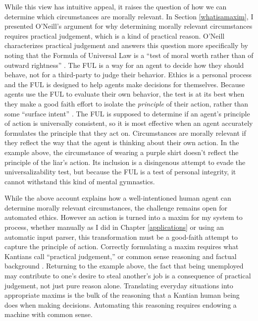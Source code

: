 \begin{isabellebody}
\begin{isamarkuptext}
While this view has intuitive appeal, it raises the question of how we can determine
which circumstances are morally relevant. In Section \ref{whatisamaxim}, I presented O'Neill's argument for why
determining morally relevant circumstances requires practical judgement, which is a kind of practical
reason. O'Neill characterizes practical judgement and answers this question more specifically
by noting that the Formula of Universal Law is
a ``test of moral worth rather than of outward rightness'' \citep[98]{constofreason}. The FUL is a way 
for an agent to decide how they should behave, not for a third-party to judge their behavior. Ethics is 
a personal process and the FUL is designed to help agents make decisions for themselves. Because agents use 
the FUL to evaluate their own behavior, the test is at its 
best when they make a good faith effort to isolate the \emph{principle} of their action, rather than some
``surface intent'' \citep[87]{constofreason}. The FUL is supposed to determine if an agent's principle of action
is universally consistent, so it is most effective when an agent accurately formulates the principle that
they act on. Circumstances are morally relevant if they reflect the way that the agent is 
thinking about their own action. In the example above, the circumstance of wearing a purple shirt doesn't reflect
the principle of the liar's action. Its inclusion is a disingenous attempt to evade the universalizability
test, but because the FUL is a test of personal integrity, it cannot withstand this kind of mental
gymnastics. 
 
While the above account explains how a well-intentioned human agent can determine 
morally relevant circumstances, the challenge remains open for automated ethics. However an action is turned into a maxim for my system 
to process, whether manually as I did in Chapter \ref{applications} or using an automatic input 
parser, this transformation must be a good-faith attempt to capture the principle of action. 
Correctly formulating a maxim requires what Kantians call ``practical judgement,'' or
common sense reasoning and factual background \citep{oneilluniversallaws}. Returning to the example above, the fact that being 
unemployed may contribute to one's desire to steal another's job is a consequence of practical
judgement, not just pure reason alone. Translating everyday situations into appropriate maxims is
the bulk of the reasoning that a Kantian human being does when making decisions. Automating this
reasoning requires endowing a machine with common sense. 


\end{isamarkuptext}
\end{isabellebody}
